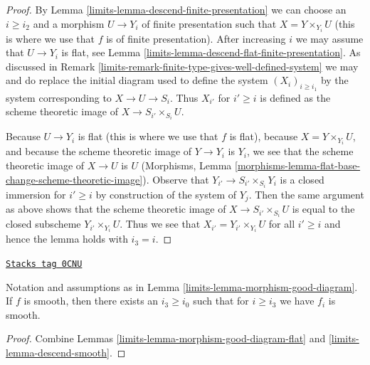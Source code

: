 \begin{proof}

By Lemma \ref{limits-lemma-descend-finite-presentation}
we can choose an $i \geq i_2$ and a morphism
$U \to Y_i$ of finite presentation such that $X = Y \times_{Y_i} U$
(this is where we use that $f$ is of finite presentation).
After increasing $i$ we may assume that $U \to Y_i$ is flat, see
Lemma \ref{limits-lemma-descend-flat-finite-presentation}.
As discussed in Remark \ref{limits-remark-finite-type-gives-well-defined-system}
we may and do replace the initial diagram used to define the system
$(X_i)_{i \geq i_1}$ by the system corresponding to
$X \to U \to S_i$. Thus $X_{i'}$ for $i' \geq i$ is defined as
the scheme theoretic image of $X \to S_{i'} \times_{S_i} U$.

\medskip\noindent
Because $U \to Y_i$ is flat (this is where we use that $f$ is flat),
because $X = Y \times_{Y_i} U$, and
because the scheme theoretic image of $Y \to Y_i$ is $Y_i$,
we see that the scheme theoretic image of $X \to U$ is $U$
(Morphisms, Lemma
\ref{morphisms-lemma-flat-base-change-scheme-theoretic-image}).
Observe that $Y_{i'} \to S_{i'} \times_{S_i} Y_i$ is a closed
immersion for $i' \geq i$ by construction of the system of $Y_j$.
Then the same argument as above shows that the scheme theoretic image
of $X \to S_{i'} \times_{S_i} U$
is equal to the closed subscheme $Y_{i'} \times_{Y_i} U$.
Thus we see that $X_{i'} = Y_{i'} \times_{Y_i} U$ for all $i' \geq i$
and hence the lemma holds with $i_3 = i$.
\end{proof}

\begin{lemma}
\label{limits-lemma-morphism-good-diagram-smooth}
\href{https://stacks.math.columbia.edu/tag/0CNU}{\texttt{Stacks tag 0CNU}}

Notation and assumptions as in Lemma \ref{limits-lemma-morphism-good-diagram}.
If $f$ is smooth, then there exists an $i_3 \geq i_0$ such that for
$i \geq i_3$ we have $f_i$ is smooth.
\end{lemma}

\begin{proof}

Combine Lemmas \ref{limits-lemma-morphism-good-diagram-flat} and
\ref{limits-lemma-descend-smooth}.
\end{proof}

